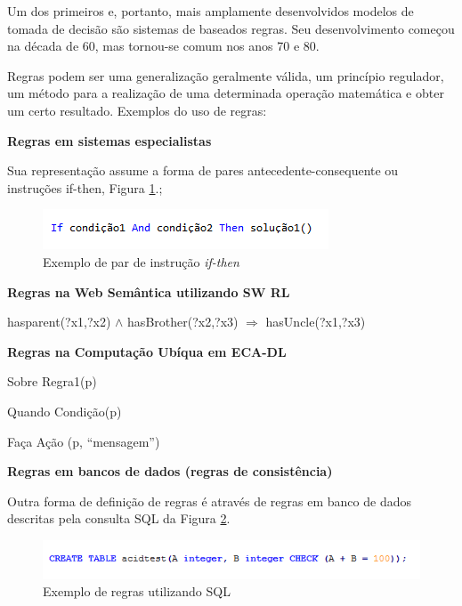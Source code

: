 \documentclass[12pt,a4paper,compsoc]{IEEEtran}
\begin{document}
  Um dos primeiros e, portanto, mais amplamente desenvolvidos modelos de tomada de decisão são
  sistemas de baseados regras. Seu  desenvolvimento começou na década de 60, mas tornou-se comum
  nos anos 70 e 80.
  
  Regras podem ser  uma generalização geralmente válida, um princípio regulador, um método para a
  realização de uma determinada operação matemática e obter um certo resultado. Exemplos do uso de
  regras:
  
  \textbf{Regras em sistemas especialistas}

  Sua representação assume a forma de pares antecedente-consequente ou instruções if-then, Figura
  \ref{if-then}.;

  \begin{figure}[ht]
    \centerline{\includegraphics[scale=1]{imagens/if_then}}
    \caption{Exemplo de par de instrução \textit{if-then}}
    \label{if-then}
  \end{figure}
  
  \textbf{Regras na Web Semântica utilizando SW RL}
  
  hasparent(?x1,?x2) $\wedge$ hasBrother(?x2,?x3) $\Rightarrow$ hasUncle(?x1,?x3)

  \textbf{Regras na Computação Ubíqua em ECA-DL}

  Sobre Regra1(p)
  
  Quando Condição(p)
  
  Faça Ação (p, ``mensagem'')


  \textbf{Regras em bancos de dados (regras de consistência)}
  
  Outra forma de definição de regras é através de regras em banco de dados descritas pela consulta SQL
  da Figura \ref{create-table}.
  
  \begin{figure}[ht]
    \centerline{\includegraphics[scale=.6]{imagens/acidtest}}
    \caption{Exemplo de regras utilizando SQL}
    \label{create-table}
  \end{figure}
\end{document}

